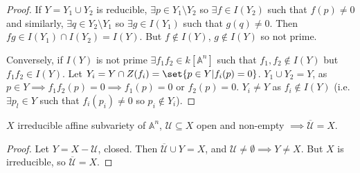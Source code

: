 \documentclass{article}
\newcommand{\A}{\mathbb{A}}
\begin{document}
\begin{proof}
    If $Y = Y_1 \cup Y_2$ is reducible, $\exists p \in Y_1 \setminus Y_2$ so $\exists f \in I(Y_2)$ such that $f(p) \neq 0$ and similarly, $\exists q \in Y_2 \setminus Y_1$ so $\exists g \in I(Y_1)$ such that $g(q) \neq 0$.
    Then $fg \in I(Y_1) \cap I(Y_2) = I(Y)$. But $f \notin I(Y)$, $g \notin I(Y)$ so not prime.
    \begin{center}
    \end{center}

    Conversely, if $I(Y)$ is not prime $\exists f_1 f_2 \in k[\A^n]$ such that $f_1, f_2 \notin I(Y)$ but $f_1 f_2 \in I(Y)$.
    Let $Y_i = Y \cap Z(f_i) = \set{p \in Y | f_i(p) = 0}$. $Y_1 \cup Y_2 = Y$, as $p \in Y \implies f_1 f_2 (p) = 0 \implies f_1(p) = 0$ or $f_2(p) = 0$.
    $Y_i \neq Y$ as $f_i \notin I(Y)$ (i.e. $\exists p_l \in Y$ such that $f_i(p_i) \neq 0$ so $p_i \notin Y_i$).
\end{proof}
\begin{lemma}
    $X$ irreducible affine subvariety of $\A^n$, $\mathcal{U} \subseteq X$ open and non-empty $\implies \overline{\mathcal{U}} = X$.
\end{lemma}
\begin{proof}
    Let $Y = X - \mathcal{U}$, closed. Then $\overline{\mathcal{U}} \cup Y = X$, and $\mathcal{U} \neq \emptyset \implies Y \neq X$. But $X$ is irreducible, so $\overline{\mathcal{U}} = X$.
\end{proof}
\end{document}

